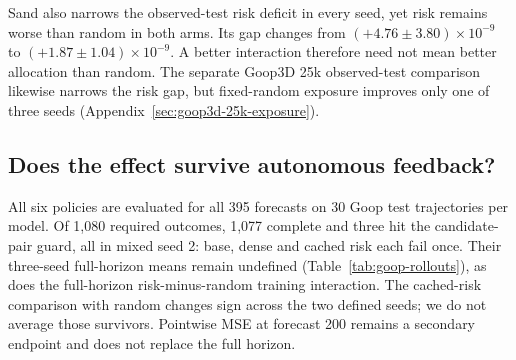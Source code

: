 Sand also narrows the observed-test risk deficit in every seed, yet risk remains worse than random in both arms. Its gap changes from $(+4.76\pm3.80)\times10^{-9}$ to $(+1.87\pm1.04)\times10^{-9}$. A better interaction therefore need not mean better allocation than random. The separate Goop3D 25k observed-test comparison likewise narrows the risk gap, but fixed-random exposure improves only one of three seeds (Appendix~\ref{sec:goop3d-25k-exposure}).

\subsection{Does the effect survive autonomous feedback?}
All six policies are evaluated for all 395 forecasts on 30 Goop test trajectories per model. Of 1,080 required outcomes, 1,077 complete and three hit the candidate-pair guard, all in mixed seed 2: base, dense and cached risk each fail once. Their three-seed full-horizon means remain undefined (Table~\ref{tab:goop-rollouts}), as does the full-horizon risk-minus-random training interaction. The cached-risk comparison with random changes sign across the two defined seeds; we do not average those survivors. Pointwise MSE at forecast 200 remains a secondary endpoint and does not replace the full horizon.

